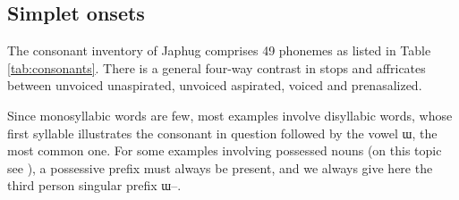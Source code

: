 \documentclass[oldfontcommands,oneside,a4paper,11pt]{article}
\newcommand{\ipa}[1]{{\phon #1}} %
\begin{document}
 \subsection{Simplet onsets}
 The consonant inventory of Japhug comprises 49 phonemes as listed in Table \ref{tab:consonants}. There is a general four-way contrast in stops and affricates between unvoiced unaspirated, unvoiced aspirated, voiced and prenasalized.
 
Since monosyllabic words are few,  most examples involve disyllabic words, whose first syllable illustrates the consonant in question followed by the vowel \ipa{ɯ}, the most common one. For some examples involving possessed nouns (on this topic see \citealt[6]{jacques14antipassive}), a possessive prefix must always be present, and we always give here the third person singular prefix  \ipa{ɯ--}.
 
 \begin{table}
 \caption{Consonantal phonemes in Japhug Rgyalrong} \label{tab:consonants}  \centering
\end{table}
\end{document}
